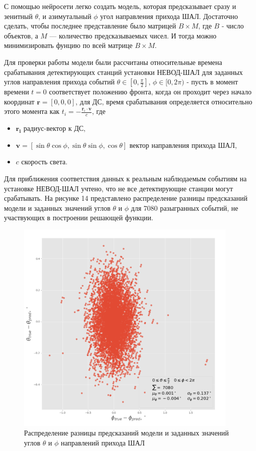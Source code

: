 С помощью нейросети легко создать модель, которая предсказывает сразу и зенитный \(\theta\), и азимутальный \(\phi\) угол направления прихода ШАЛ. Достаточно сделать, чтобы последнее представление было матрицей \(B \times M\), где \(B\) - число объектов, а \(M\) — количество предсказываемых чисел. И тогда можно минимизировать фунцию по всей матрице \(B \times M\).

Для проверки работы модели были рассчитаны относительные времена срабатывания  детектирующих станций установки НЕВОД-ШАЛ для заданных углов направления прихода событий \(\theta \in [0,\frac{\pi}{2}]\), \(\phi \in [0, 2\pi)\) - пусть в момент времени \(t=0\) соответствует положению фронта, когда он проходит через начало координат \(\textbf{r}=[0,0,0]\), для ДС, время срабатывания определяется относительно этого момента как 
\(t_i = - \frac{\mathbf{r}_i \cdot \mathbf{v}}{c}\), где 
\begin{itemize}
    \item \(\mathbf{r_i}\) радиус-вектор к ДС,
    \item \(\mathbf{v} = [\sin{\theta}\cos{\phi}, \sin{\theta}\sin{\phi}, \cos{\theta}]\) вектор направления прихода ШАЛ,
    \item \(c\) скорость света.
\end{itemize}

Для приближения соответствия данных к реальным наблюдаемым событиям на установке НЕВОД-ШАЛ учтено, что не все детектирующие станции могут срабатывать. На рисунке 14 представлено распределение разницы предсказаний модели и заданных значений углов \(\theta\) и \(\phi\) для 7080 разыгранных событий, не участвующих в построении решающей функции.
\begin{figure}[ht]
    \centering
    \includegraphics[width=0.95\textwidth]{images/test_theta_vs_phi_diff.png}
    \caption{Распределение разницы предсказаний модели и заданных значений углов \(\theta\) и \(\phi\) направлений прихода ШАЛ}
    \label{fig:nn}
\end{figure}

